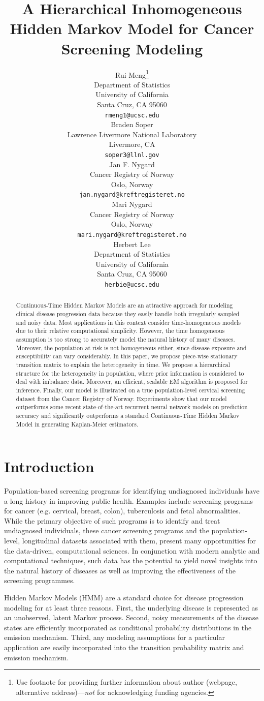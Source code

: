 \documentclass{article}
\title{A Hierarchical Inhomogeneous Hidden Markov Model for Cancer Screening Modeling}
\author{%
  Rui Meng\thanks{Use footnote for providing further information
    about author (webpage, alternative address)---\emph{not} for acknowledging
    funding agencies.} \\
  Department of Statistics\\
  University of California\\
  Santa Cruz, CA 95060 \\
  \texttt{rmeng1@ucsc.edu} \\
   \And
   Braden Soper \\
   Lawrence Livermore National Laboratory \\
   Livermore, CA \\
   \texttt{soper3@llnl.gov} \\
   \AND
   Jan F. Nygard \\
   Cancer Registry of Norway \\
   Oslo, Norway \\
   \texttt{jan.nygard@kreftregisteret.no} \\
   \And
   Mari Nygard \\
   Cancer Registry of Norway \\
   Oslo, Norway \\
   \texttt{mari.nygard@kreftregisteret.no} \\
   \And
   Herbert Lee \\
   Department of Statistics\\
   University of California\\
   Santa Cruz, CA 95060 \\
   \texttt{herbie@ucsc.edu} \\
}
\begin{document}
\maketitle

\begin{abstract}
 Continuous-Time Hidden Markov Models are an attractive approach for modeling clinical disease progression data because they easily handle both irregularly sampled and noisy data. Most applications in this context consider time-homogeneous models due to their relative computational simplicity. However, the time homogeneous assumption is too strong to accurately model the natural history of many diseases. Moreover, the population at risk is not homogeneous either, since disease exposure and susceptibility can vary considerably. In this paper, we propose piece-wise stationary transition matrix to explain the heterogeneity in time. We propose a hierarchical structure for the heterogeneity in population, where prior information is considered to deal with imbalance data. Moreover, an efficient, scalable EM algorithm is proposed for inference. Finally, our model is illustrated on a true population-level cervical screening dataset from the Cancer Registry of Norway. Experiments show that our model outperforms some recent state-of-the-art recurrent neural network models on prediction accuracy and significantly outperforms a standard Continuous-Time Hidden Markov Model in generating Kaplan-Meier estimators.
\end{abstract}

\section{Introduction}
Population-based screening programs for identifying undiagnosed individuals have a long history in improving public health. Examples include screening programs for cancer (e.g. cervical, breast, colon), tuberculosis and fetal abnormalities. While the primary objective of such programs is to identify and treat undiagnosed individuals, these cancer screening programs and the population-level, longitudinal datasets associated with them,  present many opportunities for the data-driven, computational sciences. In conjunction with modern analytic and computational techniques, such data has the potential to yield novel insights into the natural history of diseases as well as improving the effectiveness of the screening programmes. 

Hidden Markov Models (HMM) are a standard choice for disease progression modeling for at least three reasons. 
First, the underlying disease is represented as an unobserved, latent Markov process. Second, noisy measurements of the disease states are efficiently incorporated as conditional probability distributions in the emission mechanism. Third, any modeling assumptions for a particular application are easily incorporated into the transition probability matrix and emission mechanism.
\end{document}
